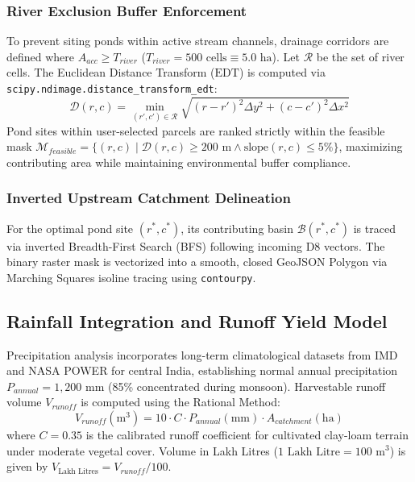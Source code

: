 \documentclass[manuscript,screen,review]{acmart}
\begin{document}
\subsubsection{River Exclusion Buffer Enforcement}
To prevent siting ponds within active stream channels, drainage corridors are defined where $A_{acc} \ge T_{river}$ ($T_{river} = 500\text{ cells} \equiv 5.0\text{ ha}$). Let $\mathcal{R}$ be the set of river cells. The Euclidean Distance Transform ($\text{EDT}$) is computed via \texttt{scipy.ndimage.distance\_transform\_edt}:
\begin{equation}
    \mathcal{D}(r, c) = \min_{(r', c') \in \mathcal{R}} \sqrt{(r - r')^2 \Delta y^2 + (c - c')^2 \Delta x^2}
\end{equation}
Pond sites within user-selected parcels are ranked strictly within the feasible mask $\mathcal{M}_{feasible} = \{(r, c) \mid \mathcal{D}(r, c) \ge 200\text{ m} \land \text{slope}(r, c) \le 5\%\}$, maximizing contributing area while maintaining environmental buffer compliance.

\subsubsection{Inverted Upstream Catchment Delineation}
For the optimal pond site $(r^*, c^*)$, its contributing basin $\mathcal{B}(r^*, c^*)$ is traced via inverted Breadth-First Search (BFS) following incoming D8 vectors. The binary raster mask is vectorized into a smooth, closed GeoJSON Polygon via Marching Squares isoline tracing using \texttt{contourpy}.

\subsection{Rainfall Integration and Runoff Yield Model}
Precipitation analysis incorporates long-term climatological datasets from IMD and NASA POWER for central India, establishing normal annual precipitation $P_{annual} = 1,200\text{ mm}$ (85\% concentrated during monsoon). Harvestable runoff volume $V_{runoff}$ is computed using the Rational Method:
\begin{equation}
    V_{runoff} (\text{m}^3) = 10 \cdot C \cdot P_{annual} (\text{mm}) \cdot A_{catchment} (\text{ha})
\end{equation}
where $C = 0.35$ is the calibrated runoff coefficient for cultivated clay-loam terrain under moderate vegetal cover. Volume in Lakh Litres ($1\text{ Lakh Litre} = 100\text{ m}^3$) is given by $V_{\text{Lakh Litres}} = V_{runoff} / 100$.
\end{document}
